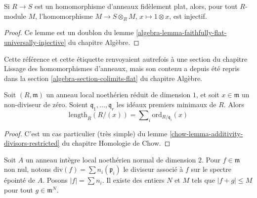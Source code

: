 \begin{lemma}
\label{lemma-faithfully-flat-injective}
Si $R \to S$ est un homomorphisme d'anneaux fidèlement plat, alors, pour tout
$R$-module $M$, l'homomorphisme $M \to S \otimes_R M$, $x \mapsto 1 \otimes x$,
est injectif.
\end{lemma}

\begin{proof}
Ce lemme est un doublon du lemme
\ref{algebra-lemma-faithfully-flat-universally-injective} du chapitre Algèbre.
\end{proof}

\begin{remark}
\label{remark-section-colimits}
Cette référence et cette étiquette renvoyaient autrefois à une section du
chapitre Lissage des homomorphismes d'anneaux, mais son contenu a depuis été
repris dans la section \ref{algebra-section-colimits-flat} du chapitre Algèbre.
\end{remark}

\begin{lemma}
\label{lemma-not-domain}
Soit $(R, \mathfrak m)$ un anneau local noethérien réduit de dimension $1$,
et soit $x \in \mathfrak m$ un non-diviseur de zéro. Soient
$\mathfrak q_1, \ldots, \mathfrak q_r$ les idéaux premiers minimaux de $R$.
Alors
$$
\text{length}_R(R/(x)) = \sum\nolimits_i \text{ord}_{R/\mathfrak q_i}(x)
$$
\end{lemma}

\begin{proof}
C'est un cas particulier (très simple) du lemme
\ref{chow-lemma-additivity-divisors-restricted} du chapitre Homologie de Chow.
\end{proof}

\begin{lemma}
\label{lemma-bound-primes}
Soit $A$ un anneau intègre local noethérien normal de dimension $2$.
Pour $f \in \mathfrak m$ non nul, notons
$\text{div}(f) = \sum n_i (\mathfrak p_i)$
le diviseur associé à $f$ sur le spectre épointé de $A$.
Posons $|f| = \sum n_i$. Il existe des entiers $N$ et $M$
tels que $|f + g| \leq M$ pour tout $g \in \mathfrak m^N$.
\end{lemma}

